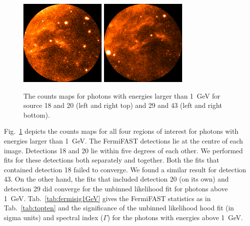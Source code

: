 \documentclass[useAMS,usenatbib]{mn2e}
\begin{document}
\begin{figure}
  \includegraphics[width=0.45\columnwidth]{src_29_1GeV}
  \includegraphics[width=0.45\columnwidth]{src_43_1GeV}
  \caption{The counts maps for photons with energies larger than 1~GeV
    for source 18 and 20 (left and right top) and 29 and 43 (left and
    right bottom).}
  \label{fig:1GeVcmap}
\end{figure}
Fig.~\ref{fig:1GeVcmap} depicts the counts maps for all four regions
of interest for photons with energies larger than 1~GeV.  The
FermiFAST detections lie at the centre of each image. Detections 18 and 20
lie within five degrees of each other.  We performed fits for these
detections both separately and together.  Both the fits that contained
detection 18 failed to converge.  We found a similar result for detection
43.  On the other hand, the fits that included detection 20 (on its own)
and detection 29 did converge for the unbinned likelihood fit for photons
above 1~GeV. Tab.~\ref{tab:fermisig1GeV} gives the FermiFAST
statistics as in Tab.~\ref{tab:topten} and the significance of the
unbinned likelihood hood fit (in sigma units) and spectral index
($\Gamma$) for the photons with energies above 1~GeV.
\end{document}

